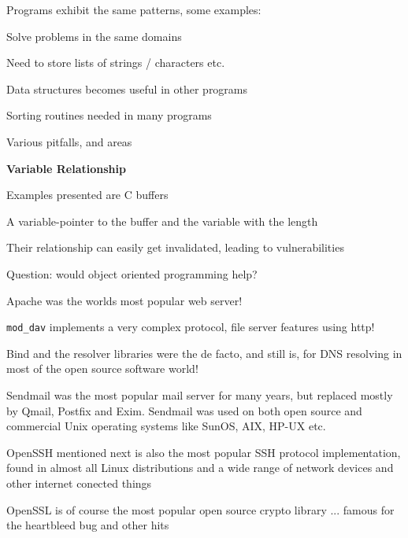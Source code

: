 \documentclass[Screen16to9,17pt]{foils}
\begin{document}


\begin{list2}
\item Programs exhibit the same patterns, some examples:
\item Solve problems in the same domains
\item Need to store lists of strings / characters etc.
\item Data structures becomes useful in other programs
\item Sorting routines needed in many programs
\end{list2}






Various pitfalls, and areas
\begin{list2}
\item {\bf Variable Relationship}
\item Examples presented are C buffers
\item A variable-pointer to the buffer and the variable with the length
\item Their relationship can easily get invalidated, leading to vulnerabilities
\item Question: would object oriented programming help?
\end{list2}





\begin{list2}
\item Apache was the worlds most popular web server!
\item \verb+mod_dav+ implements a very complex protocol, file server features using http!
\item Bind and the resolver libraries were the de facto, and still is, for DNS resolving in most of the open source software world!
\item Sendmail was the most popular mail server for many years, but replaced mostly by Qmail, Postfix and Exim. Sendmail was used on both open source and commercial Unix operating systems like SunOS, AIX, HP-UX etc.
\item OpenSSH mentioned next is also the most popular SSH protocol implementation, found in almost all Linux distributions and a wide range of network devices and other internet conected things
\item OpenSSL is of course the most popular open source crypto library ... famous for the heartbleed bug and other hits
\end{list2}
\end{document}
